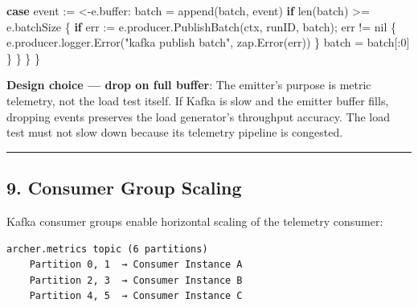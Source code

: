 \documentclass[
]{article}
\newenvironment{Shaded}{}{}
\newcommand{\BuiltInTok}[1]{\textcolor[rgb]{0.00,0.50,0.00}{#1}}
\newcommand{\ControlFlowTok}[1]{\textcolor[rgb]{0.00,0.44,0.13}{\textbf{#1}}}
\newcommand{\DecValTok}[1]{\textcolor[rgb]{0.25,0.63,0.44}{#1}}
\newcommand{\NormalTok}[1]{#1}
\newcommand{\OperatorTok}[1]{\textcolor[rgb]{0.40,0.40,0.40}{#1}}
\newcommand{\OtherTok}[1]{\textcolor[rgb]{0.00,0.44,0.13}{#1}}
\newcommand{\StringTok}[1]{\textcolor[rgb]{0.25,0.44,0.63}{#1}}
\begin{document}
\begin{Shaded}
\begin{Highlighting}[]
        \ControlFlowTok{case}\NormalTok{ event }\OperatorTok{:=} \OperatorTok{\textless{}{-}}\NormalTok{e}\OperatorTok{.}\NormalTok{buffer}\OperatorTok{:}
\NormalTok{            batch }\OperatorTok{=} \BuiltInTok{append}\OperatorTok{(}\NormalTok{batch}\OperatorTok{,}\NormalTok{ event}\OperatorTok{)}
            \ControlFlowTok{if} \BuiltInTok{len}\OperatorTok{(}\NormalTok{batch}\OperatorTok{)} \OperatorTok{\textgreater{}=}\NormalTok{ e}\OperatorTok{.}\NormalTok{batchSize }\OperatorTok{\{}
                \ControlFlowTok{if}\NormalTok{ err }\OperatorTok{:=}\NormalTok{ e}\OperatorTok{.}\NormalTok{producer}\OperatorTok{.}\NormalTok{PublishBatch}\OperatorTok{(}\NormalTok{ctx}\OperatorTok{,}\NormalTok{ runID}\OperatorTok{,}\NormalTok{ batch}\OperatorTok{);}\NormalTok{ err }\OperatorTok{!=} \OtherTok{nil} \OperatorTok{\{}
\NormalTok{                    e}\OperatorTok{.}\NormalTok{producer}\OperatorTok{.}\NormalTok{logger}\OperatorTok{.}\NormalTok{Error}\OperatorTok{(}\StringTok{"kafka publish batch"}\OperatorTok{,}\NormalTok{ zap}\OperatorTok{.}\NormalTok{Error}\OperatorTok{(}\NormalTok{err}\OperatorTok{))}
                \OperatorTok{\}}
\NormalTok{                batch }\OperatorTok{=}\NormalTok{ batch}\OperatorTok{[:}\DecValTok{0}\OperatorTok{]}
            \OperatorTok{\}}
        \OperatorTok{\}}
    \OperatorTok{\}}
\OperatorTok{\}}
\end{Highlighting}
\end{Shaded}

\textbf{Design choice --- drop on full buffer}: The emitter's purpose is
metric telemetry, not the load test itself. If Kafka is slow and the
emitter buffer fills, dropping events preserves the load generator's
throughput accuracy. The load test must not slow down because its
telemetry pipeline is congested.

\begin{center}\rule{0.5\linewidth}{0.5pt}\end{center}

\hypertarget{consumer-group-scaling}{%
\subsection{9. Consumer Group Scaling}\label{consumer-group-scaling}}

Kafka consumer groups enable horizontal scaling of the telemetry
consumer:

\begin{verbatim}
archer.metrics topic (6 partitions)
    Partition 0, 1  → Consumer Instance A
    Partition 2, 3  → Consumer Instance B
    Partition 4, 5  → Consumer Instance C
\end{verbatim}
\end{document}
